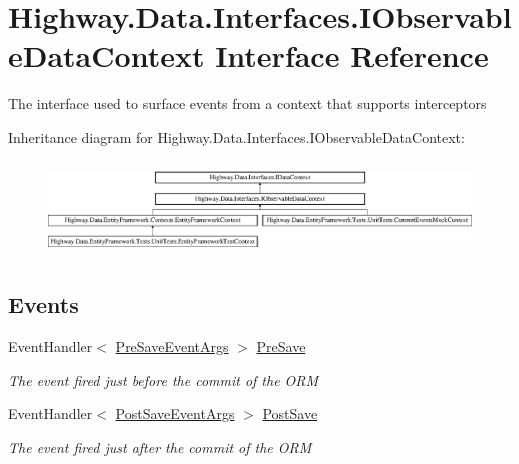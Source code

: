 \hypertarget{interface_highway_1_1_data_1_1_interfaces_1_1_i_observable_data_context}{\section{Highway.\-Data.\-Interfaces.\-I\-Observable\-Data\-Context Interface Reference}
\label{interface_highway_1_1_data_1_1_interfaces_1_1_i_observable_data_context}
}


The interface used to surface events from a context that supports interceptors  


Inheritance diagram for Highway.\-Data.\-Interfaces.\-I\-Observable\-Data\-Context\-:\begin{figure}[H]
\begin{center}
\leavevmode
\includegraphics[height=2.505593cm]{interface_highway_1_1_data_1_1_interfaces_1_1_i_observable_data_context}
\end{center}
\end{figure}
\subsection*{Events}
\begin{DoxyCompactItemize}
\item 
Event\-Handler$<$ \hyperlink{class_highway_1_1_data_1_1_interceptors_1_1_events_1_1_pre_save_event_args}{Pre\-Save\-Event\-Args} $>$ \hyperlink{interface_highway_1_1_data_1_1_interfaces_1_1_i_observable_data_context_add85ecbc05ebf7174003841bdbd72dfe}{Pre\-Save}
\begin{DoxyCompactList}\small\item\em The event fired just before the commit of the O\-R\-M \end{DoxyCompactList}\item 
Event\-Handler$<$ \hyperlink{class_highway_1_1_data_1_1_interceptors_1_1_events_1_1_post_save_event_args}{Post\-Save\-Event\-Args} $>$ \hyperlink{interface_highway_1_1_data_1_1_interfaces_1_1_i_observable_data_context_a1978b914f7b94a37a6e86f3314326ca9}{Post\-Save}
\begin{DoxyCompactList}\small\item\em The event fired just after the commit of the O\-R\-M \end{DoxyCompactList}\end{DoxyCompactItemize}
